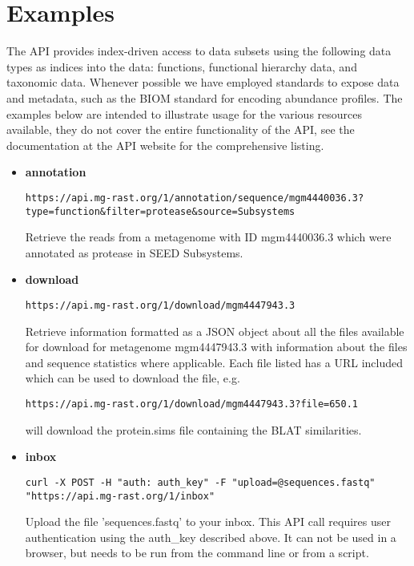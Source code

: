 \section{Examples}
The API provides index-driven access to data subsets using the following data types as indices into the data: functions, functional hierarchy data, and taxonomic data. Whenever possible we have employed standards to expose data and metadata, such as the BIOM standard for encoding abundance profiles. The examples below are intended to illustrate usage for the various resources available, they do not cover the entire functionality of the API, see the documentation at the API website for the comprehensive listing.

\begin{itemize}
\item 
\textbf{annotation}
\begin{small}
\begin{lstlisting}
https://api.mg-rast.org/1/annotation/sequence/mgm4440036.3?type=function&filter=protease&source=Subsystems
\end{lstlisting}
\end{small} Retrieve the reads from a metagenome with ID mgm4440036.3 which were annotated as  protease in SEED Subsystems.

\item
\textbf{download}
\begin{small}
\begin{lstlisting}
https://api.mg-rast.org/1/download/mgm4447943.3
\end{lstlisting}
\end{small} Retrieve information formatted as a JSON object about all the files available for download for metagenome mgm4447943.3 with information about the files and sequence statistics where applicable. Each file listed has a URL included which can be used to download the file, e.g.
\begin{small}
\begin{lstlisting}
https://api.mg-rast.org/1/download/mgm4447943.3?file=650.1
\end{lstlisting}
\end{small} will download the protein.sims file containing the BLAT similarities.

\item
\textbf{inbox}
\begin{small}
\begin{lstlisting}
curl -X POST -H "auth: auth_key" -F "upload=@sequences.fastq" "https://api.mg-rast.org/1/inbox"
\end{lstlisting}
\end{small}
Upload the file 'sequences.fastq' to your inbox. This API call requires user authentication using the auth\_key described above. It can not be used in a browser, but needs to be run from the command line or from a script.


\end{itemize}
